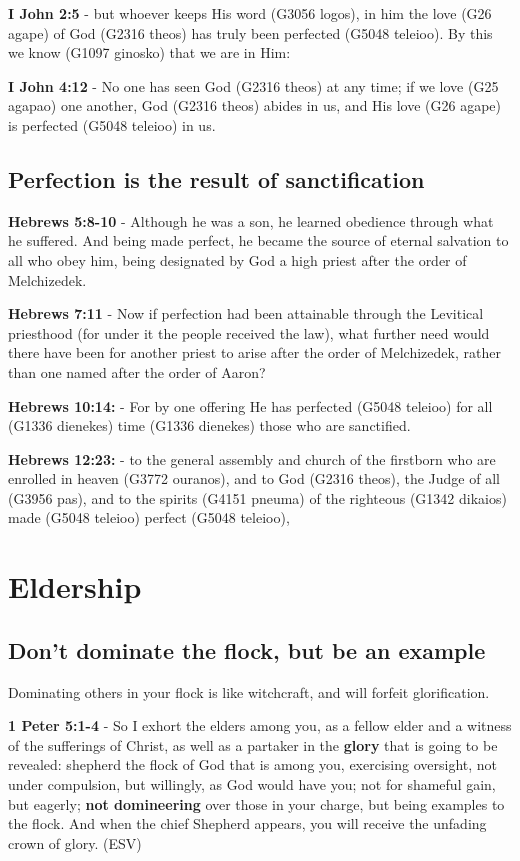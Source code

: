 \documentclass[11pt]{article}
\begin{document}
\textbf{I John 2:5} - but whoever keeps His word (G3056 logos), in him the love (G26 agape) of God (G2316 theos) has truly been perfected (G5048 teleioo). By this we know (G1097 ginosko) that we are in Him:

\textbf{I John 4:12} - No one has seen God (G2316 theos) at any time; if we love (G25 agapao) one another, God (G2316 theos) abides in us, and His love (G26 agape) is perfected (G5048 teleioo) in us.

\subsection{Perfection is the result of sanctification}
\label{sec:org3b5e3ff}

\textbf{Hebrews 5:8-10} - Although he was a son, he learned obedience through what he suffered. And being made perfect, he became the source of eternal salvation to all who obey him, being designated by God a high priest after the order of Melchizedek.

\textbf{Hebrews 7:11} - Now if perfection had been attainable through the Levitical priesthood (for under it the people received the law), what further need would there have been for another priest to arise after the order of Melchizedek, rather than one named after the order of Aaron?

\textbf{Hebrews 10:14:} - For by one offering He has perfected (G5048 teleioo) for all (G1336 dienekes) time (G1336 dienekes) those who are sanctified.

\textbf{Hebrews 12:23:} - to the general assembly and church of the firstborn who are enrolled in heaven (G3772 ouranos), and to God (G2316 theos), the Judge of all (G3956 pas), and to the spirits (G4151 pneuma) of the righteous (G1342 dikaios) made (G5048 teleioo) perfect (G5048 teleioo),

\section{Eldership}
\label{sec:org0020ab7}
\subsection{Don't dominate the flock, but be an example}
\label{sec:org0e83141}
Dominating others in your flock is like witchcraft, and will forfeit glorification.

\textbf{1 Peter 5:1-4} - So I exhort the elders among you, as a fellow elder and a witness of the sufferings of Christ, as well as a partaker in the \textbf{glory} that is going to be revealed: shepherd the flock of God that is among you, exercising oversight, not under compulsion, but willingly, as God would have you; not for shameful gain, but eagerly; \textbf{not domineering} over those in your charge, but being examples to the flock. And when the chief Shepherd appears, you will receive the unfading crown of glory. (ESV)
\end{document}
